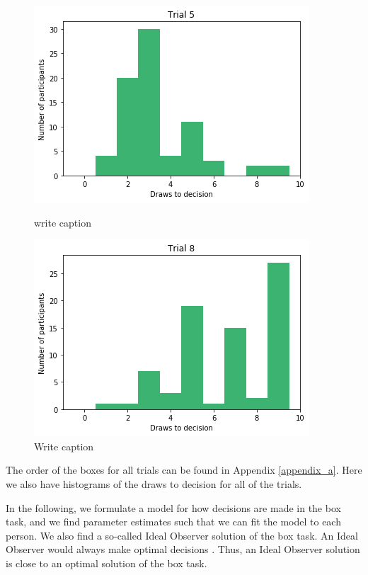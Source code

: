 \begin{figure}
    \centering
    \begin{minipage}{0.45\textwidth} 
        \centering
        \includegraphics[scale=0.4]{pictures/dtd5_histogram.png}
        \caption[Draws to decisions in Trial 5]{write caption}
        \label{fig:histogram_trial5}
    \end{minipage}\hfill
    \begin{minipage}{0.45\textwidth} 
        \centering
        \includegraphics[scale=0.4]{pictures/dtd8_histogram.png}
        \caption[Draws to decisions in Trial 8]{Write caption}
        \label{fig:histogram_trial8}
    \end{minipage}
\end{figure}

The order of the boxes for all trials can be found in Appendix \ref{appendix_a}. Here we also have histograms of the draws to decision for all of the trials.

In the following, we formulate a model for how decisions are made in the box task, and we find parameter estimates such that we can fit the model to each person. We also find a so-called Ideal Observer solution of the box task. An Ideal Observer would always make optimal decisions \citep{idealObs}. Thus, an Ideal Observer solution is close to an optimal solution of the box task. 



